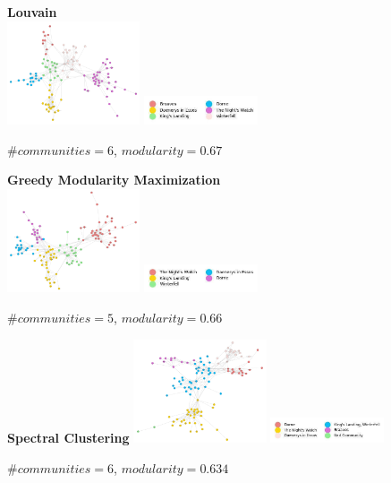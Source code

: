 \documentclass[10pt,twocolumn,letterpaper]{article}
\begin{document}
\begin{figure}[!h]
    \centering
    \textbf{Louvain} \\
    \includegraphics[width=0.35\textwidth]{img/s5/communities_louvain.jpg}
    \includegraphics[width=0.3\textwidth]{img/s5/louvain_legend.jpg}\\
    \caption{\small{$\#communities=6$, $modularity=0.67$}}
    \label{fig:louvain_s5}
\end{figure}



\begin{figure}[!h]
    \centering
    \textbf{Greedy Modularity Maximization}\\
    \includegraphics[width=0.35\textwidth]{img/s5/communities_gmm.jpg}
    \includegraphics[width=0.3\textwidth]{img/s5/gmm_legend.jpg}\\
    \caption{\small{$\#communities=5$, $modularity=0.66$}}
    \label{fig:gmm_s5}
\end{figure}

\begin{figure}[!h]
    \centering
    \textbf{Spectral Clustering}
    \includegraphics[width=0.35\textwidth]{img/s5/communities_sc.jpg}
    \includegraphics[width=0.3\textwidth]{img/s5/sc_legend.jpg}\\
    \caption{\small{$\#communities=6$, $modularity=0.634$}}
    \label{fig:sc_s5}
\end{figure}
\end{document}
